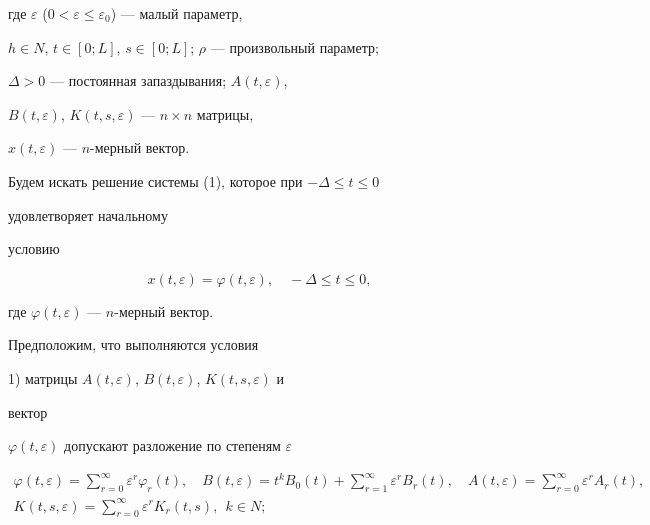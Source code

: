 где $\varepsilon$ ($0<\varepsilon\le\varepsilon_0$) --- малый параметр, 


$h\in N$, $t\in[0;L]$, $s\in[0;L]$; $\rho$ --- произвольный параметр; 


$\Delta>0$ --- постоянная запаздывания; $A(t,\varepsilon)$, 


$B(t,\varepsilon)$, $K(t,s,\varepsilon)$ --- $n\times n$ матрицы, 


$x(t,\varepsilon)$ --- $n$-мер\-ный вектор. 


 


Будем искать решение системы (1), которое при $-\Delta\le t\le0$ 


удовлетворяет начальному 


условию 


$$ 


x(t,\varepsilon)=\varphi(t,\varepsilon),\quad -\Delta\le t\le0, 


$$ 


где $\varphi(t,\varepsilon)$ --- $n$-мерный вектор. 


 


Предположим, что выполняются условия 


 


1) матрицы $A(t,\varepsilon)$, $B(t,\varepsilon)$, $K(t,s,\varepsilon)$ и 


вектор 


$\varphi(t,\varepsilon)$ допускают разложение по степеням $\varepsilon$ 


\begin{gather*} 


\varphi(t,\varepsilon)=\sum^\infty_{r=0}\varepsilon^r 


\varphi_r(t),\quad B(t,\varepsilon)=t^k B_0(t)+ 


\sum^\infty_{r=1}\varepsilon^r B_r(t),\quad 


A(t,\varepsilon)=\sum^\infty_{r=0} 


\varepsilon^r A_r(t), \\ 


% 


K(t,s,\varepsilon)=\sum^\infty_{r=0} 


\varepsilon^r K_r(t,s),\ \ k\in N; 


\end{gather*} 


 


